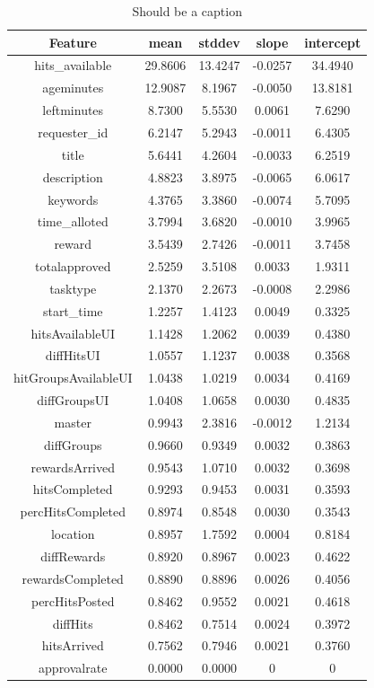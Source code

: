 \begin{table}[ht]
\scriptsize
\begin{tabular}{|c|c|c|c|c|}
\hline
Feature              & mean      & stddev    & slope     & intercept \\
\hline
hits\_available      & 29.8606 & 13.4247 & -0.0257 & 34.4940 \\
ageminutes           & 12.9087 &  8.1967 & -0.0050 & 13.8181 \\
leftminutes          &  8.7300 &  5.5530 & 0.0061 & 7.6290 \\
requester\_id        &  6.2147 &  5.2943 & -0.0011 & 6.4305 \\
title                &  5.6441 &  4.2604 & -0.0033 & 6.2519 \\
description          &  4.8823 &  3.8975 & -0.0065 & 6.0617 \\
keywords             &  4.3765 &  3.3860 & -0.0074 & 5.7095 \\
time\_alloted        &  3.7994 &  3.6820 & -0.0010 & 3.9965 \\
reward               &  3.5439 &  2.7426 & -0.0011 & 3.7458 \\
totalapproved        &  2.5259 &  3.5108 & 0.0033 & 1.9311 \\
tasktype             &  2.1370 &  2.2673 & -0.0008 & 2.2986 \\
start\_time          &  1.2257 &  1.4123 & 0.0049 & 0.3325 \\
hitsAvailableUI      &  1.1428 &  1.2062 & 0.0039 & 0.4380 \\
diffHitsUI           &  1.0557 &  1.1237 & 0.0038 & 0.3568 \\
hitGroupsAvailableUI &  1.0438 &  1.0219 & 0.0034 & 0.4169 \\
diffGroupsUI         &  1.0408 &  1.0658 & 0.0030 & 0.4835 \\
master               &  0.9943 &  2.3816 & -0.0012 & 1.2134 \\
diffGroups           &  0.9660 &  0.9349 & 0.0032 & 0.3863 \\
rewardsArrived       &  0.9543 &  1.0710 & 0.0032 & 0.3698 \\
hitsCompleted        &  0.9293 &  0.9453 & 0.0031 & 0.3593 \\
percHitsCompleted    &  0.8974 &  0.8548 & 0.0030 & 0.3543 \\
location             &  0.8957 &  1.7592 & 0.0004 & 0.8184 \\
diffRewards          &  0.8920 &  0.8967 & 0.0023 & 0.4622 \\
rewardsCompleted     &  0.8890 &  0.8896 & 0.0026 & 0.4056 \\
percHitsPosted       &  0.8462 &  0.9552 & 0.0021 & 0.4618 \\
diffHits             &  0.8462 &  0.7514 & 0.0024 & 0.3972 \\
hitsArrived          &  0.7562 &  0.7946 & 0.0021 & 0.3760 \\
approvalrate         &  0.0000 &  0.0000 & 0 & 0 \\
\hline
\end{tabular}
\caption {Should be a caption}
\label{table:feats}
\end{table}